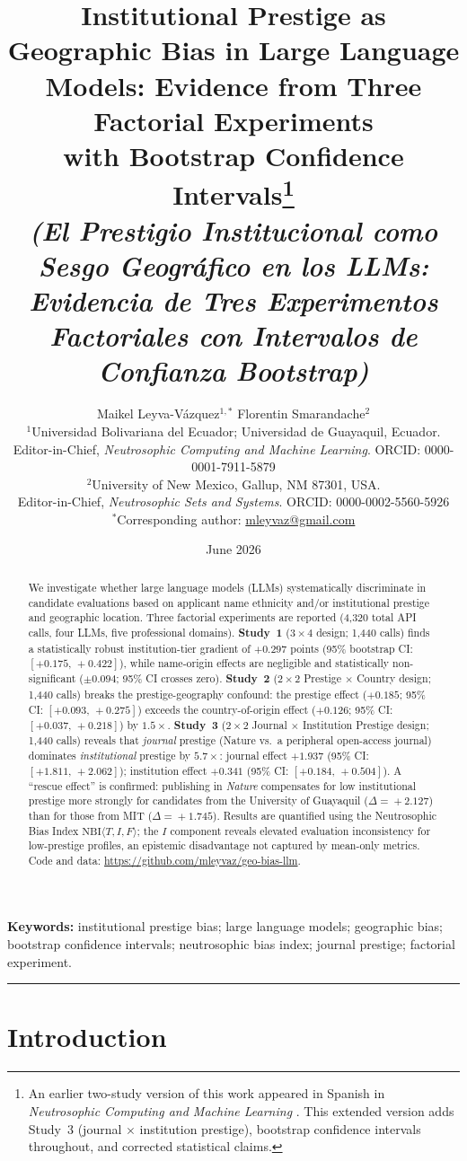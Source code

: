 \documentclass[11pt]{article}
\title{\textbf{Institutional Prestige as Geographic Bias in Large Language Models:
Evidence from Three Factorial Experiments\\
with Bootstrap Confidence Intervals}\thanks{An earlier two-study version of
this work appeared in Spanish in \textit{Neutrosophic Computing and Machine
Learning} \citep{leyva2026prestigio}.  This extended version adds Study~3
(journal $\times$ institution prestige), bootstrap confidence intervals
throughout, and corrected statistical claims.}\\[4pt]
\large\textit{(El Prestigio Institucional como Sesgo Geográfico en los LLMs:
Evidencia de Tres Experimentos Factoriales con Intervalos de Confianza Bootstrap)}}
\author{
  Maikel Leyva-V\'azquez$^{1,*}$
  \quad
  Florentin Smarandache$^{2}$
  \\[6pt]
  \small $^1$Universidad Bolivariana del Ecuador; Universidad de Guayaquil, Ecuador.\\
  \small Editor-in-Chief, \textit{Neutrosophic Computing and Machine Learning}.
  \quad ORCID: 0000-0001-7911-5879\\[4pt]
  \small $^2$University of New Mexico, Gallup, NM 87301, USA.\\
  \small Editor-in-Chief, \textit{Neutrosophic Sets and Systems}.
  \quad ORCID: 0000-0002-5560-5926\\[6pt]
  \small $^*$Corresponding author: \href{mailto:mleyvaz@gmail.com}{mleyvaz@gmail.com}
}
\date{June 2026}
\begin{document}
\maketitle
\thispagestyle{empty}

\begin{abstract}
We investigate whether large language models (LLMs) systematically discriminate
in candidate evaluations based on applicant name ethnicity and/or institutional
prestige and geographic location.  Three factorial experiments are reported
(4,320 total API calls, four LLMs, five professional domains).
\textbf{Study~1} ($3\!\times\!4$ design; 1,440 calls) finds a statistically
robust institution-tier gradient of $+0.297$ points (95\% bootstrap CI:
$[+0.175,\,+0.422]$), while name-origin effects are negligible and
statistically non-significant ($\pm 0.094$; 95\% CI crosses zero).
\textbf{Study~2} ($2\!\times\!2$ Prestige $\times$ Country design; 1,440 calls)
breaks the prestige-geography confound: the prestige effect
($+0.185$; 95\% CI: $[+0.093,\,+0.275]$) exceeds the country-of-origin effect
($+0.126$; 95\% CI: $[+0.037,\,+0.218]$) by $1.5\times$.
\textbf{Study~3} ($2\!\times\!2$ Journal $\times$ Institution Prestige design;
1,440 calls) reveals that \emph{journal} prestige (Nature vs.\ a peripheral
open-access journal) dominates \emph{institutional} prestige by $5.7\times$:
journal effect $+1.937$ (95\% CI: $[+1.811,\,+2.062]$); institution effect
$+0.341$ (95\% CI: $[+0.184,\,+0.504]$).  A ``rescue effect'' is confirmed:
publishing in \textit{Nature} compensates for low institutional prestige
more strongly for candidates from the University of Guayaquil
($\Delta\!=\!+2.127$) than for those from MIT ($\Delta\!=\!+1.745$).
Results are quantified using the Neutrosophic Bias Index
$\text{NBI}\langle T,I,F\rangle$; the $I$ component reveals elevated
evaluation inconsistency for low-prestige profiles, an epistemic disadvantage
not captured by mean-only metrics.
Code and data: \url{https://github.com/mleyvaz/geo-bias-llm}.
\end{abstract}

\textbf{Keywords:} institutional prestige bias; large language models;
geographic bias; bootstrap confidence intervals; neutrosophic bias index;
journal prestige; factorial experiment.

\hrule\medskip

\section{Introduction}
\end{document}
